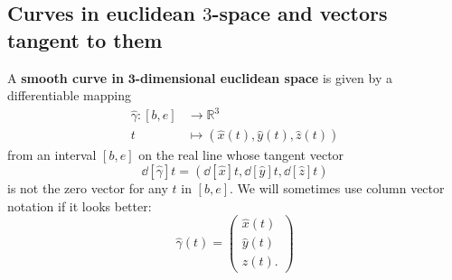 \documentclass[newpage,hints,handout]{ximera}
\begin{document}


\subsection{Curves in euclidean $3$-space and vectors tangent to them}

\begin{definition}
A \textbf{smooth curve in }$\mathbf{3}$\textbf{-dimensional euclidean space}
is given by a differentiable mapping%
\begin{align*}
\hat{\gamma}:[b,e] &\rightarrow \mathbb{R}^{3}\\
t &\mapsto (\hat{x}(t), \hat{y}(t), \hat{z}(t))
\end{align*}
from an interval $[b,e]$ on the real line whose tangent vector
\[
\dd[\hat{\gamma}]{t} =\left(
  \dd[\hat{x}]{t},
  \dd[\hat{y}]{t},
  \dd[\hat{z}]{t}
\right)
\]
is not the zero vector for any $t$ in $[b,e]$.  We will sometimes use column
vector notation if it looks better:%
\[
\hat{\gamma}(t) = \begin{pmatrix}
  \hat{x}(t)\\
  \hat{y}(t)\\
  \hat{z}(t).
\end{pmatrix}
\]
\end{definition}
\end{document}
